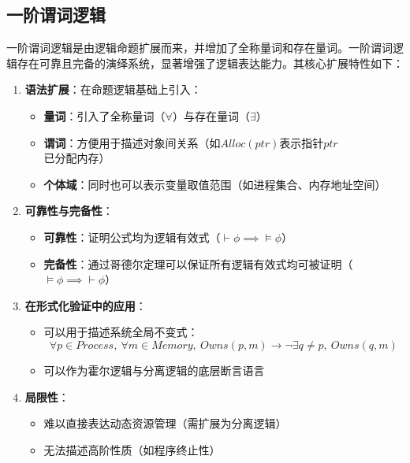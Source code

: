 \subsection{一阶谓词逻辑}
一阶谓词逻辑是由逻辑命题扩展而来，并增加了全称量词和存在量词。一阶谓词逻辑存在可靠且完备的演绎系统，显著增强了逻辑表达能力。其核心扩展特性如下：
\begin{enumerate}
    \item \textbf{语法扩展}：在命题逻辑基础上引入：
    \begin{itemize}
        \item \textbf{量词}：引入了全称量词（$\forall$）与存在量词（$\exists$）
        \item \textbf{谓词}：方便用于描述对象间关系（如$Alloc(ptr)$表示指针$ptr$已分配内存）
        \item \textbf{个体域}：同时也可以表示变量取值范围（如进程集合、内存地址空间）
    \end{itemize}
    
    \item \textbf{可靠性与完备性}：
    \begin{itemize}
        \item \textbf{可靠性}：证明公式均为逻辑有效式（$\vdash \phi \implies \models \phi$）
        \item \textbf{完备性}：通过哥德尔定理可以保证所有逻辑有效式均可被证明（$\models \phi \implies \vdash \phi$）
    \end{itemize}
    
    \item \textbf{在形式化验证中的应用}：
    \begin{itemize}
        \item 可以用于描述系统全局不变式：
        \begin{equation*}
          \forall p{\in}Process,\ \forall m{\in}Memory,\ 
          \mathit{Owns}(p, m) \to \lnot \exists q{\neq}p,\ \mathit{Owns}(q, m)
        \end{equation*}
        \item 可以作为霍尔逻辑与分离逻辑的底层断言语言
    \end{itemize}

    \item \textbf{局限性}：
    \begin{itemize}
        \item 难以直接表达动态资源管理（需扩展为分离逻辑）
        \item 无法描述高阶性质（如程序终止性）
    \end{itemize}
\end{enumerate}

